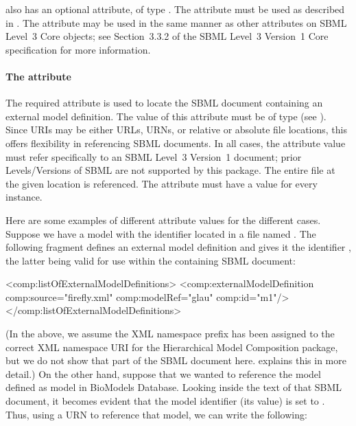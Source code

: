 \ExternalModelDefinition also has an optional  attribute, of
type .  The  attribute must be used as
described in .  The  attribute may be used
in the same manner as other  attributes on SBML Level~3 Core
objects; see Section~3.3.2 of the SBML Level~3 Version~1 Core
specification for more information.


\paragraph{The \fixttspace{} attribute}

The required attribute  is used to locate the SBML
document containing an external model definition.  The value of this
attribute must be of type  (see ).
Since URIs may be either URLs, URNs, or relative or absolute file
locations, this offers flexibility in referencing SBML documents.  In
all cases, the  attribute value must refer specifically to
an SBML Level~3 Version~1 document; prior Levels/Versions of SBML are
not supported by this package.  The entire file at the given location is
referenced.  The  attribute must have a value for every
\ExternalModelDefinition instance.

Here are some examples of different  attribute values for
the different cases.  Suppose we have a model with the identifier
 located in a file named .  The following
fragment defines an external model definition and gives it the
identifier , the latter being valid for use within the
containing SBML document:

\begin{example}
<comp:listOfExternalModelDefinitions>
    <comp:externalModelDefinition comp:source="firefly.xml" comp:modelRef="glau" comp:id="m1"/>
</comp:listOfExternalModelDefinitions>
\end{example}

(In the above, we assume the XML namespace prefix  has been
assigned to the correct XML namespace URI for the Hierarchical Model
Composition package, but we do not show that part of the SBML document
here.   explains this in more detail.)  On the other
hand, suppose that we wanted to reference the model defined as model
 in BioModels Database.  Looking inside the text of
that SBML document, it becomes evident that the model identifier (its
 value) is set to .  Thus, using a URN to reference
that model, we can write the following:

